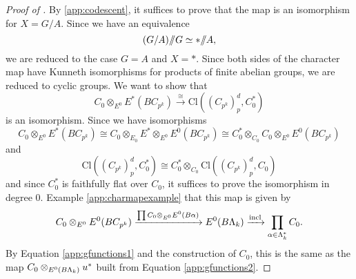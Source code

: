 \begin{proof}[{Proof of }]
By \ref{app:codescent}, it suffices to prove that the map is an isomorphism for $X = G/A$. Since we have an equivalence
\[
(G/A) /\!\!/ G \simeq * /\!\!/ A,
\]
we are reduced to the case $G = A$ and $X = *$. Since both sides of the character map have Kunneth isomorphisms for products of finite abelian groups, we are reduced to cyclic groups. We want to show that 
\[
C_0 \otimes_{E^0} E^*(BC_{p^k}) \xrightarrow{\cong} \mathrm{Cl}((C_{p^k})_{p}^{d}, C_{0}^{*})
\]
is an isomorphism. Since we have isomorphisms
\[
C_0 \otimes_{E^0} E^*(BC_{p^k}) \cong C_{0} \otimes_{E_0} E^* \otimes_{E^0} E^0(BC_{p^k}) \cong C_{0}^* \otimes_{C_0} C_0 \otimes_{E^0} E^0(BC_{p^k})
\]
and
\[
\mathrm{Cl}((C_{p^k})_{p}^{d}, C_{0}^{*}) \cong C_{0}^* \otimes_{C_0} \mathrm{Cl}((C_{p^k})_{p}^{d}, C_{0})
\]
and since $C_{0}^*$ is faithfully flat over $C_0$, it suffices to prove the isomorphism in degree $0$. Example \ref{app:charmapexample} that this map is given by 
\[
C_0 \otimes_{E^0} E^0(BC_{p^k}) \xrightarrow{\prod C_{0} \otimes_{E^0} E^0(B\alpha)} E^0(B\Lambda_k) \xrightarrow{\mathrm{incl}} \prod_{\alpha \in \Lambda_k^*}C_0.
\]
By Equation \ref{app:gfunctions1} and the construction of $C_0$, this is the same as the map $C_0 \otimes_{E^0(B\Lambda_k)} u^*$ built from Equation \ref{app:gfunctions2}.


%
\end{proof}




